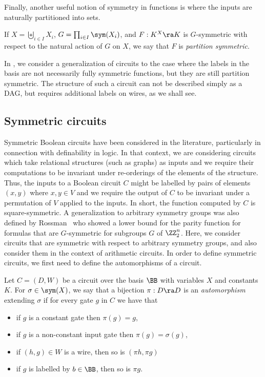 \documentclass{toc}
\begin{document}
Finally, another useful notion of symmetry in functions is where the inputs are
naturally partitioned into sets.

\begin{definition}
  If $X = \biguplus_{i \in I} X_i$, $G = \prod_{i \in I}\sym(X_i)$, and $F: K^X
  \ra K$ is $G$-symmetric with respect to the natural action of $G$ on $X$, we
  say that
  $F$ is \emph{partition symmetric}.
\end{definition}

In , we consider a generalization of
circuits to the case where the labels in the basis are not necessarily fully
symmetric functions, but they are still partition symmetric. The structure of
such a circuit can not be described simply as a DAG, but requires additional
labels on wires, as we shall see.


\subsection{Symmetric circuits}
Symmetric Boolean circuits have been considered in the literature, particularly
in connection with definability in logic. In that context, we are considering
circuits which take relational structures (such as graphs) as inputs and we
require their computations to be invariant under re-orderings of the elements of
the structure.  Thus, the inputs to a Boolean circuit $C$ might be labelled by pairs of elements $(x,y)$ where $x,y \in V$ and we require the output of $C$ to be invariant under a permutation of $V$ applied to the inputs.  In short, the function computed by $C$ is square-symmetric.  A generalization to arbitrary symmetry groups was also defined by Rossman~\cite{Rossman19} who showed a lower bound for the parity function for formulas that are $G$-symmetric for subgroups $G$ of $\ZZ_2^n$.
Here, we consider circuits that are symmetric with respect to arbitrary symmetry groups, and also consider them in the context of arithmetic circuits. In order to define
symmetric circuits, we first need to define the automorphisms of a circuit.

\begin{definition}
  Let $C = (D, W)$ be a circuit over the basis $\BB$ with variables $X$ and
  constants $K$. For $\sigma \in \sym(X)$, we say that a bijection $\pi : D \ra
  D$ is an \emph{automorphism} extending $\sigma$ if for every gate $g$ in $C$
  we have that
  \begin{itemize}
  \item if $g$ is a constant gate then $\pi (g) = g$,
  \item if $g$ is a non-constant input gate then $\pi (g) = \sigma (g)$,
  \item if $(h,g) \in W$ is a wire, then so is $(\pi h, \pi g)$
  \item if $g$ is labelled by $b \in \BB$, then so is $\pi g$.
  \end{itemize}
\end{definition}
\end{document}
